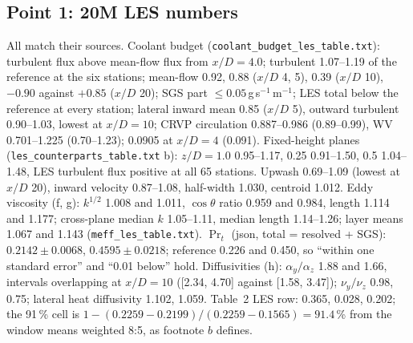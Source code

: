 \documentclass[10pt,a4paper]{article}
\begin{document}
\subsection*{Point 1: 20M LES numbers}
All match their sources. Coolant budget (\texttt{coolant\_budget\_les\_table.txt}): turbulent flux above mean-flow
flux from $x/D=4.0$; turbulent 1.07--1.19 of the reference at the six stations; mean-flow 0.92, 0.88 ($x/D$ 4, 5),
0.39 ($x/D$ 10), $-0.90$ against $+0.85$ ($x/D$ 20); SGS part $\le0.05$\,g\,s$^{-1}$\,m$^{-1}$; LES total below the
reference at every station; lateral inward mean 0.85 ($x/D$ 5), outward turbulent 0.90--1.03, lowest at $x/D=10$;
CRVP circulation 0.887--0.986 (0.89--0.99), WV 0.701--1.225 (0.70--1.23); 0.0905 at $x/D=4$ (0.091).
Fixed-height planes (\texttt{les\_counterparts\_table.txt} b): $z/D=1.0$ 0.95--1.17, 0.25 0.91--1.50, 0.5 1.04--1.48,
LES turbulent flux positive at all 65 stations. Upwash 0.69--1.09 (lowest at $x/D$ 20), inward velocity 0.87--1.08,
half-width 1.030, centroid 1.012. Eddy viscosity (f, g): $k^{1/2}$ 1.008 and 1.011, $\cos\theta$ ratio 0.959 and
0.984, length 1.114 and 1.177; cross-plane median $k$ 1.05--1.11, median length 1.14--1.26; layer means 1.067 and
1.143 (\texttt{meff\_les\_table.txt}). $\Pr_t$ (json, total = resolved + SGS): $0.2142\pm0.0068$, $0.4595\pm0.0218$;
reference 0.226 and 0.450, so ``within one standard error'' and ``0.01 below'' hold. Diffusivities (h):
$\alpha_y/\alpha_z$ 1.88 and 1.66, intervals overlapping at $x/D=10$ ([2.34, 4.70] against [1.58, 3.47]);
$\nu_y/\nu_z$ 0.98, 0.75; lateral heat diffusivity 1.102, 1.059. Table~2 LES row: 0.365, 0.028, 0.202; the 91\,\%
cell is $1-(0.2259-0.2199)/(0.2259-0.1565)=91.4$\,\% from the window means weighted 8:5, as footnote $b$ defines.
\end{document}
